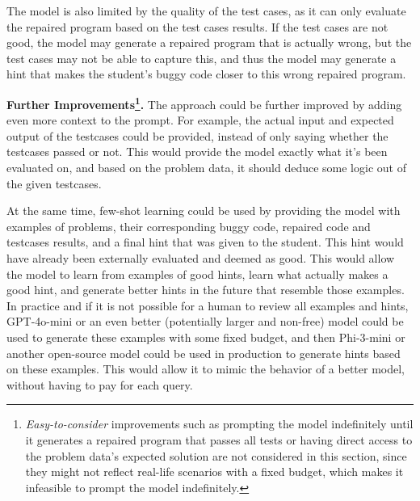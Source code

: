 \documentclass{article}
\begin{document}
The model is also limited by the quality of the test cases, as it can only evaluate the repaired program based on the test cases results. If the test cases are not good, the model may generate a repaired program that is actually wrong, but the test cases may not be able to capture this, and thus the model may generate a hint that makes the student's buggy code closer to this wrong repaired program.

\textbf{Further Improvements\footnote{\textit{Easy-to-consider} improvements such as prompting the model indefinitely until it generates a repaired program that passes all tests or having direct access to the problem data's expected solution are not considered in this section, since they might not reflect real-life scenarios with a fixed budget, which makes it infeasible to prompt the model indefinitely.}.} The approach could be further improved by adding even more context to the prompt. For example, the actual input and expected output of the testcases could be provided, instead of only saying whether the testcases passed or not. This would provide the model exactly what it's been evaluated on, and based on the problem data, it should deduce some logic out of the given testcases. 

At the same time, few-shot learning could be used by providing the model with examples of problems, their corresponding buggy code, repaired code and testcases results, and a final hint that was given to the student. This hint would have already been externally evaluated and deemed as good. This would allow the model to learn from examples of good hints, learn what actually makes a good hint, and generate better hints in the future that resemble those examples. In practice and if it is not possible for a human to review all examples and hints, GPT-4o-mini or an even better (potentially larger and non-free) model could be used to generate these examples with some fixed budget, and then Phi-3-mini or another open-source model could be used in production to generate hints based on these examples. This would allow it to mimic the behavior of a better model, without having to pay for each query.

\end{document}
